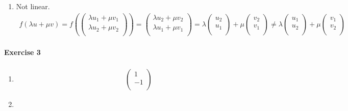 \documentclass{article}
\begin{document}
\begin{enumerate}
    \item Not linear. \begin{align*}
        f(\lambda u + \mu v) = f\left(\begin{pmatrix}
            \lambda u_1 + \mu v_1 \\
            \lambda u_2 + \mu v_2 \\
        \end{pmatrix}\right) = \begin{pmatrix}
            \lambda u_2 + \mu v_2 \\
            \lambda u_1 + \mu v_1 \\
        \end{pmatrix} = \lambda\begin{pmatrix}
            u_2 \\
            u_1 \\
        \end{pmatrix} + \mu\begin{pmatrix}
            v_2 \\
            v_1 \\
        \end{pmatrix} \neq \lambda\begin{pmatrix}
            u_1 \\
            u_2 \\
        \end{pmatrix} + \mu\begin{pmatrix}
            v_1 \\
            v_2 \\
        \end{pmatrix}
    \end{align*}
\end{enumerate}

\paragraph{Exercise 3}

\begin{enumerate}
    \item \begin{align*}
        \begin{pmatrix}
            1 \\ -1 \\
        \end{pmatrix}
    \end{align*}

    \item 
\end{enumerate}
\end{document}
